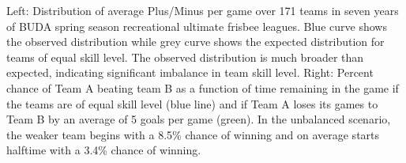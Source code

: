 Left: Distribution of average Plus/Minus per game over 171 teams in seven years of BUDA spring season recreational ultimate frisbee leagues.  Blue curve shows the observed distribution while grey curve shows the expected distribution for teams of equal skill level. The observed distribution is much broader than expected, indicating significant imbalance in team skill level. Right: Percent chance of Team A beating team B as a function of time remaining in the game if the teams are of equal skill level (blue line) and if Team A loses its games to Team B by an average of 5 goals per game (green). In the unbalanced scenario, the weaker team begins with a 8.5\% chance of winning and on average starts halftime with a 3.4\% chance of winning.